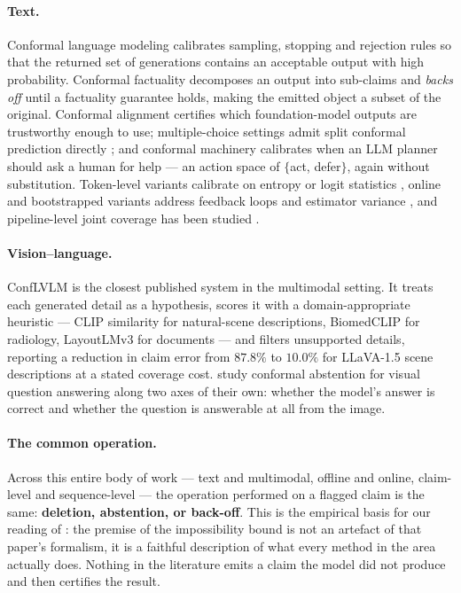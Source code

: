 \documentclass{article}
\theoremstyle{plain}
\theoremstyle{definition}
\theoremstyle{remark}
\begin{document}
\paragraph{Text.}
Conformal language modeling \citep{conformallm} calibrates sampling, stopping and rejection
rules so that the returned set of generations contains an acceptable output with high
probability. Conformal factuality \citep{conformalfactuality} decomposes an output into
sub-claims and \emph{backs off} until a factuality guarantee holds, making the emitted object
a subset of the original. Conformal alignment \citep{gui2024conformal} certifies which
foundation-model outputs are trustworthy enough to use; multiple-choice settings admit split
conformal prediction directly \citep{kumar2023}; and conformal machinery calibrates when an
LLM planner should ask a human for help \citep{ren2023knowno} --- an action space of
$\{$act, defer$\}$, again without substitution. Token-level variants calibrate on entropy or
logit statistics \citep{tecp,cover}, online and bootstrapped variants address feedback loops
and estimator variance \citep{onlineabstention,tamingvar}, and pipeline-level joint coverage
has been studied \citep{pasc}.

\paragraph{Vision--language.}
ConfLVLM \citep{conflvlm} is the closest published system in the multimodal setting. It
treats each generated detail as a hypothesis, scores it with a domain-appropriate heuristic
--- CLIP similarity \citep{clip} for natural-scene descriptions, BiomedCLIP for radiology,
LayoutLMv3 for documents --- and filters unsupported details, reporting a reduction in
claim error from $87.8\%$ to $10.0\%$ for LLaVA-1.5 scene descriptions at a stated
coverage cost. \citet{twoaxes} study conformal abstention for visual question answering along
two axes of their own: whether the model's answer is correct and whether the question is
answerable at all from the image.

\paragraph{The common operation.}
Across this entire body of work --- text and multimodal, offline and online, claim-level
and sequence-level --- the operation performed on a flagged claim is the same:
\textbf{deletion, abstention, or back-off}. This is the empirical basis for our reading of
\citet{crcimposs}: the premise of the impossibility bound is not an artefact of that
paper's formalism, it is a faithful description of what every method in the area actually
does. Nothing in the literature emits a claim the model did not produce and then certifies
the result.
\end{document}
